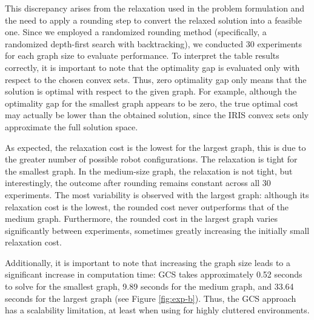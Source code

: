 This discrepancy arises from the relaxation used in the problem formulation and the need to apply a rounding step to convert the relaxed solution into a feasible one. Since we employed a randomized rounding method (specifically, a randomized depth-first search with backtracking), we conducted $30$ experiments for each graph size to evaluate performance. To interpret the table results correctly, it is important to note that the optimality gap is evaluated only with respect to the chosen convex sets. Thus, zero optimality gap only means that the solution is optimal with respect to the given graph. For example, although the optimality gap for the smallest graph appears to be zero, the true optimal cost may actually be lower than the obtained solution, since the IRIS convex sets only approximate the full solution space.

As expected, the relaxation cost is the lowest for the largest graph, this is due to the greater number of possible robot configurations. The relaxation is tight for the smallest graph. In the medium-size graph, the relaxation is not tight, but interestingly, the outcome after rounding remains constant across all $30$ experiments. The most variability is observed with the largest graph: although its relaxation cost is the lowest, the rounded cost never outperforms that of the medium graph. Furthermore, the rounded cost in the largest graph varies significantly between experiments, sometimes greatly increasing the initially small relaxation cost.

Additionally, it is important to note that increasing the graph size leads to a significant increase in computation time: GCS takes approximately 0.52 seconds to solve for the smallest graph, 9.89 seconds for the medium graph, and 33.64 seconds for the largest graph (see Figure \ref{fig:exp-b}). Thus, the GCS approach has a scalability limitation, at least when using for highly cluttered environments.




